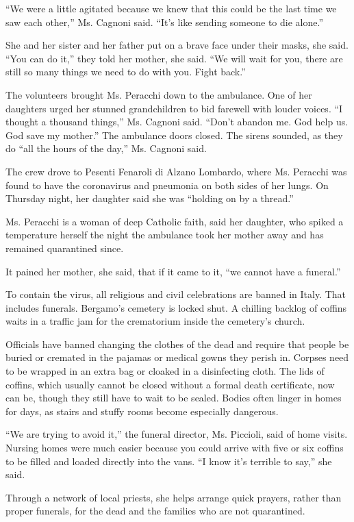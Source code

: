 ``We were a little agitated because we knew that this could be the last
time we saw each other,'' Ms. Cagnoni said. ``It's like sending someone
to die alone.''

She and her sister and her father put on a brave face under their masks,
she said. ``You can do it,'' they told her mother, she said. ``We will
wait for you, there are still so many things we need to do with you.
Fight back.''

The volunteers brought Ms. Peracchi down to the ambulance. One of her
daughters urged her stunned grandchildren to bid farewell with louder
voices. ``I thought a thousand things,'' Ms. Cagnoni said. ``Don't
abandon me. God help us. God save my mother.'' The ambulance doors
closed. The sirens sounded, as they do ``all the hours of the day,'' Ms.
Cagnoni said.

The crew drove to Pesenti Fenaroli di Alzano Lombardo, where Ms.
Peracchi was found to have the coronavirus and pneumonia on both sides
of her lungs. On Thursday night, her daughter said she was ``holding on
by a thread.''

Ms. Peracchi is a woman of deep Catholic faith, said her daughter, who
spiked a temperature herself the night the ambulance took her mother
away and has remained quarantined since.

It pained her mother, she said, that if it came to it, ``we cannot have
a funeral.''

To contain the virus, all religious and civil celebrations are banned in
Italy. That includes funerals. Bergamo's cemetery is locked shut. A
chilling backlog of coffins waits in a traffic jam for the crematorium
inside the cemetery's church.

Officials have banned changing the clothes of the dead and require that
people be buried or cremated in the pajamas or medical gowns they perish
in. Corpses need to be wrapped in an extra bag or cloaked in a
disinfecting cloth. The lids of coffins, which usually cannot be closed
without a formal death certificate, now can be, though they still have
to wait to be sealed. Bodies often linger in homes for days, as stairs
and stuffy rooms become especially dangerous.

``We are trying to avoid it,'' the funeral director, Ms. Piccioli, said
of home visits. Nursing homes were much easier because you could arrive
with five or six coffins to be filled and loaded directly into the vans.
``I know it's terrible to say,'' she said.

Through a network of local priests, she helps arrange quick prayers,
rather than proper funerals, for the dead and the families who are not
quarantined.

